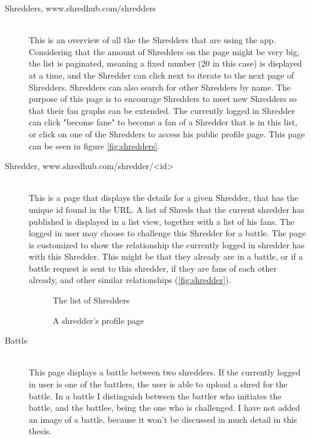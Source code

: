 \begin{description}
\item [Shredders, www.shredhub.com/shredders] \hfill \\
This is an overview of all the the Shredders that are using the app. Considering that the amount of Shredders on the page might be very big, the list is paginated, meaning a fixed number (20 in this case) is displayed at a time, and the Shredder can click next to iterate to the next page of Shredders. Shredders can also search for other Shredders by name. The purpose of this page is to encourage Shredders to meet new Shredders so that their fan graphs can be extended. The currently logged in Shredder can click "become fane" to become a fan of a Shredder that is in this list, or click on one of the Shredders to access his public profile page. This page can be seen in figure \vref {fig:shredders}. 
		
		
\item [Shredder, www.shredhub.com/shredder/<id>] \hfill \\
This is a page that displays the details for a given Shredder, that has the unique id found in the URL. A list of Shreds that the current shredder has published is displayed in a list view, together with a list of his fans. The logged in user may choose to challenge this Shredder for a battle. The page is customized to show the relationship the currently logged in shredder has with this Shredder. This might be that they already are in a battle, or if a battle request is sent to this shredder, if they are fans of each other already, and other similar relationships (\vref{fig:shredder}).
		
\begin{figure}
 \begin{center}
\end{center}
\caption{The list of Shredders}\label{fig:shredders}
\end{figure}

\begin{figure}
  \begin{center}
\end{center}
\caption{A shredder's profile page}\label{fig:shredder}
\end{figure}
		
\item [Battle] \hfill \\
This page displays a battle between two shredders. If the currently logged in user is one of the battlers, the user is able to upload a shred for the battle. In a battle I distinguish between the battler who initiates the battle, and the battlee, being the one who is challenged. I have not added an image of a battle, because it won't be discussed in much detail in this thesis.


\end{description}
